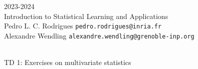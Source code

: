 \begin{flushleft}
 \hfill {} 2023-2024 \\
Introduction to Statistical Learning and Applications \\
Pedro L. C. Rodrigues   \hfill  \texttt{pedro.rodrigues@inria.fr} \\
Alexandre Wendling \hfill \texttt{alexandre.wendling@grenoble-inp.org} \\

\HRuleTop\\
\begin{center}
\Large{TD 1: Exercises on multivariate statistics}
\end{center}
\HRuleBottom
\end{flushleft}
